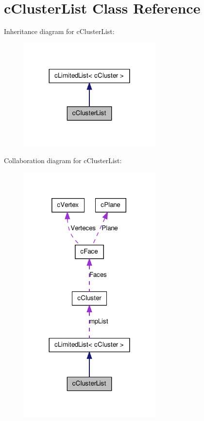 \hypertarget{classc_cluster_list}{
\section{cClusterList Class Reference}
\label{classc_cluster_list}
}


Inheritance diagram for cClusterList:
\nopagebreak
\begin{figure}[H]
\begin{center}
\leavevmode
\includegraphics[width=204pt]{classc_cluster_list__inherit__graph}
\end{center}
\end{figure}


Collaboration diagram for cClusterList:
\nopagebreak
\begin{figure}[H]
\begin{center}
\leavevmode
\includegraphics[width=204pt]{classc_cluster_list__coll__graph}
\end{center}
\end{figure}
